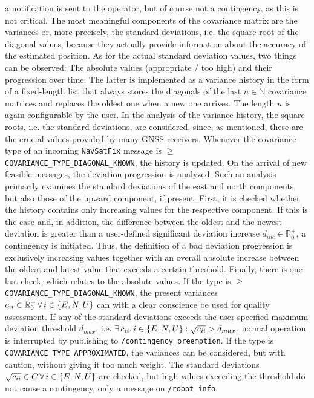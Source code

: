 \documentclass[english, master, utf8]{base/thesis_KBS}
\newcommand{\code}[1]{\colorbox{light-gray}{\texttt{#1}}}
\begin{document}
a notification is sent to the operator, but of course not a contingency, as this is not critical. The most meaningful components of the covariance matrix are the variances or, more
precisely, the standard deviations, i.e. the square root of the diagonal values, because they actually provide information about the accuracy of the estimated position.
As for the actual standard deviation values, two things can be observed: The absolute values (appropriate / too high) and their progression over time.
The latter is implemented as a variance history in the form of a fixed-length list that always stores the diagonals of the last $n \in \mathbb{N}$
covariance matrices and replaces the oldest one when a new one arrives. The length $n$ is again configurable by the user. In the analysis of the variance
history, the square roots, i.e. the standard deviations, are considered, since, as mentioned, these are the crucial values provided by many GNSS receivers.
Whenever the covariance type of an incoming \code{NavSatFix} message is $\geq$ \code{COVARIANCE\_TYPE\_DIAGONAL\_KNOWN}, the history is updated. On the arrival of new feasible 
messages, the deviation progression is analyzed. Such an analysis primarily examines the standard deviations of the east and north components, but also those of the upward component,
if present. First, it is checked whether the history contains only increasing values for the respective component. If this is the case and, in addition, the difference between the
oldest and the newest deviation is greater than a user-defined significant deviation increase $d_{inc} \in \mathbb{R}_{0}^{+}$, a contingency is initiated. Thus, the definition of a
bad deviation progression is exclusively increasing values together with an overall absolute increase between the oldest and latest value that exceeds a certain threshold.
Finally, there is one last check, which relates to the absolute values. If the type is $\geq$ \code{COVARIANCE\_TYPE\_DIAGONAL\_KNOWN}, the present variances 
$c_{ii} \in \mathbb{R}_{0}^{+} \thinspace \forall \thinspace i \in \{E, N, U\}$ can with a clear conscience be used for quality assessment. If any of the standard deviations exceeds the user-specified maximum deviation threshold $d_{max}$,
i.e. $\exists \thinspace c_{ii}, i \in \{E, N, U\} : \sqrt{c_{ii}} > d_{max}$, normal operation is interrupted by publishing to \code{/contingency\_preemption}. 
If the type is \code{COVARIANCE\_TYPE\_APPROXIMATED}, the variances can be considered, but with caution, without giving it too much weight.
The standard deviations $\sqrt{c_{ii}} \in C \thinspace \forall \thinspace i \in \{E, N, U\}$ are checked, but high values exceeding the threshold do not cause a contingency, only a message on \code{/robot\_info}.
\end{document}
